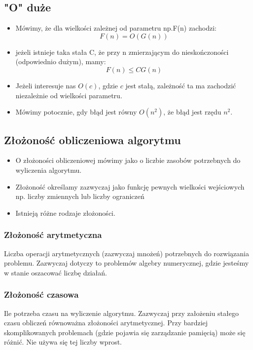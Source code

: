 \documentclass[a4paper]{article}
\begin{document}
\subsection{"O" duże}
\begin{itemize}
    \item Mówimy, że dla wielkości zależnej od parametru np.F(n) zachodzi:
    \begin{equation*}
        F(n)=O(G(n))
    \end{equation*}
    \item jeżeli istnieje taka stała C, że przy n zmierzającym do nieskończoności (odpowiednio dużym), mamy:
    \begin{equation*}
        F(n) \leq CG(n)
    \end{equation*}
    \item Jeżeli interesuje nas $O(c)$, gdzie $c$ jest stałą, zależność ta ma zachodzić niezależnie od wielkości parametru.
    \item Mówimy potocznie, gdy błąd jest równy $O(n^2)$, że błąd jest rzędu $n^2$.
\end{itemize}

\subsection{Złożoność obliczeniowa algorytmu}
\begin{itemize}
    \item O złożoności obliczeniowej mówimy jako o liczbie zasobów potrzebnych do wyliczenia algorytmu.
    \item Złożoność określamy zazwyczaj jako funkcję pewnych wielkości wejściowych np. liczby zmiennych lub liczby ograniczeń
    \item Istnieją różne rodzaje złożoności.
\end{itemize}

\subsubsection{Złożoność arytmetyczna}
Liczba operacji arytmetycznych (zazwyczaj mnożeń) potrzebnych do rozwiązania problemu. Zazwyczaj dotyczy to problemów algebry numerycznej, gdzie jesteśmy w stanie oszacować liczbę działań.

\subsubsection{Złożoność czasowa}
Ile potrzeba czasu na wyliczenie algorytmu. Zazwyczaj przy założeniu stałego czasu obliczeń równoważna złożoności arytmetycznej. Przy bardziej skomplikowanych problemach (gdzie pojawia się zarządzanie pamięcią) może się różnić.
Nie używa się tej liczby wprost.
\end{document}
